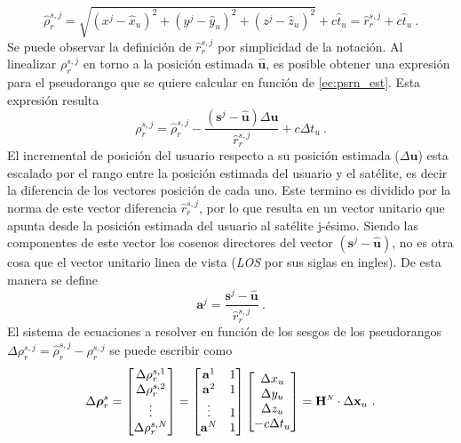 \documentclass[a4paper,12pt,oneside,onecolumn,final,openright]{book}%
\begin{document}
\begin{equation}\label{ec:psrn_est}
	\hat{\rho}_r^{s,j} = \sqrt{(x^j-\hat{x}_u)^2+(y^j-\hat{y}_u)^2+(z^j-\hat{z}_u)^2} + c\hat{t}_u = \hat{r}_r^{s,j} + c\hat{t}_u \ .
\end{equation}
	Se puede observar la definición de $\hat{r}_r^{s,j}$ por simplicidad de la notación. Al linealizar $\rho_r^{s,j}$ en torno a la posición estimada $\hat{\mathbf{u}}$, es posible obtener una expresión para el pseudorango que se quiere calcular en función de \eqref{ec:psrn_est}. Esta expresión resulta
\begin{equation}
	\rho_r^{s,j} = \hat{\rho}_r^{s,j} - \dfrac{(\mathbf{s}^j - \hat{\mathbf{u}})\Delta \mathbf{u}}{\hat{r}_r^{s,j}} + c\Delta t_u \ .
\end{equation}
	El incremental de posición del usuario respecto a su posición estimada ($\Delta \mathbf{u}$) esta escalado por el rango entre la posición estimada del usuario y el satélite, es decir la diferencia de los vectores posición de cada uno. Este termino es dividido por la norma de este vector diferencia $\hat{r}_r^{s,j}$, por lo que resulta en un vector unitario que apunta desde la posición estimada del usuario al satélite j-ésimo. Siendo las componentes de este vector los cosenos directores del vector $(\mathbf{s}^j - \hat{\mathbf{u}})$, no es otra cosa que el vector unitario linea de vista (\textit{LOS} por sus siglas en ingles). De esta manera se define
\begin{equation}\label{ec:uLOS}
	\mathbf{a}^j = \dfrac{\mathbf{s}^j-\hat{\mathbf{u}}}{\hat{r}_r^{s,j}} \ .
\end{equation}	
	El sistema de ecuaciones a resolver en función de los sesgos de los pseudorangos $\Delta\rho_r^{s,j} = \hat{\rho}_r^{s,j}-\rho_r^{s,j}$ se puede escribir como
\begin{equation}
	\Delta \boldsymbol{\rho}_r^s = \begin{bmatrix}
\Delta \rho_r^{s,1} \\
\Delta \rho_r^{s,2} \\
\vdots \\
\Delta \rho_r^{s,N} 
\end{bmatrix} = \begin{bmatrix}
\mathbf{a}^1 & 1 \\
\mathbf{a}^2 & 1 \\
\vdots & 1 \\
\mathbf{a}^N & 1 
\end{bmatrix} \begin{bmatrix}
\Delta x_u \\
\Delta y_u \\
\Delta z_u \\
-c\Delta t_u 
\end{bmatrix} = \mathbf{H}^{\scaleto{N}{4pt}}\cdot \Delta \mathbf{x}_u \ .
\end{equation}
\end{document}
